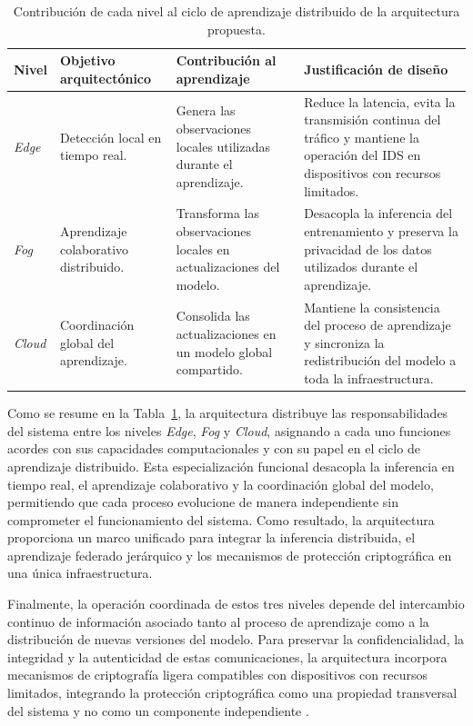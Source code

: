 \documentclass[journal,article,submit,moreauthors]{Definitions/mdpi}
\begin{document}
\begin{table}[t]
\centering
\caption{Contribución de cada nivel al ciclo de aprendizaje distribuido de la arquitectura propuesta.}
\label{tab:architecture_roles}
\renewcommand{\arraystretch}{1.25}
\footnotesize
\begin{tabular}{l p{3cm}p{3.5cm}p{5cm}}
\toprule
\textbf{Nivel} & \textbf{Objetivo arquitectónico} & \textbf{Contribución al aprendizaje} & \textbf{Justificación de diseño} \\
\midrule
\textit{Edge} & Detección local en tiempo real. & Genera las observaciones locales utilizadas durante el aprendizaje. & Reduce la latencia, evita la transmisión continua del tráfico y mantiene la operación del IDS en dispositivos con recursos limitados. \\
\textit{Fog} & Aprendizaje colaborativo distribuido. & Transforma las observaciones locales en actualizaciones del modelo. & Desacopla la inferencia del entrenamiento y preserva la privacidad de los datos utilizados durante el aprendizaje. \\
\textit{Cloud} & Coordinación global del aprendizaje. & Consolida las actualizaciones en un modelo global compartido. & Mantiene la consistencia del proceso de aprendizaje y sincroniza la redistribución del modelo a toda la infraestructura. \\
\bottomrule
\end{tabular}
\end{table}

Como se resume en la Tabla~\ref{tab:architecture_roles}, la arquitectura distribuye las responsabilidades del sistema entre los niveles \textit{Edge}, \textit{Fog} y \textit{Cloud}, asignando a cada uno funciones acordes con sus capacidades computacionales y con su papel en el ciclo de aprendizaje distribuido. Esta especialización funcional desacopla la inferencia en tiempo real, el aprendizaje colaborativo y la coordinación global del modelo, permitiendo que cada proceso evolucione de manera independiente sin comprometer el funcionamiento del sistema. Como resultado, la arquitectura proporciona un marco unificado para integrar la inferencia distribuida, el aprendizaje federado jerárquico y los mecanismos de protección criptográfica en una única infraestructura.

Finalmente, la operación coordinada de estos tres niveles depende del intercambio continuo de información asociado tanto al proceso de aprendizaje como a la distribución de nuevas versiones del modelo. Para preservar la confidencialidad, la integridad y la autenticidad de estas comunicaciones, la arquitectura incorpora mecanismos de criptografía ligera compatibles con dispositivos con recursos limitados, integrando la protección criptográfica como una propiedad transversal del sistema y no como un componente independiente \cite{NIST800232,Kaur2025}.
\end{document}
